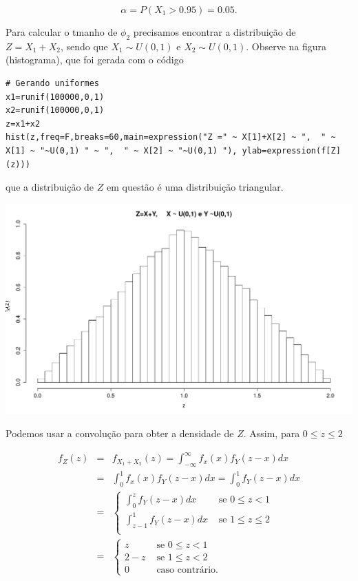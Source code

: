 \documentclass[10pt,brazil]{exam}
\begin{document}
\begin{enumerate}[1.]
\begin{enumerate}[a)]
\[\alpha=P(X_1>0.95)=0.05.\]


Para calcular o tmanho de $\phi_2$ precisamos encontrar a distribuição de $Z=X_1+X_2$, sendo que $X_1\sim U(0,1)$ e $X_2\sim U(0,1)$. Observe na figura (histograma), que foi gerada com o código 
\begin{lstlisting}
# Gerando uniformes
x1=runif(100000,0,1)
x2=runif(100000,0,1)
z=x1+x2
hist(z,freq=F,breaks=60,main=expression("Z =" ~ X[1]+X[2] ~ ",  " ~ X[1] ~ "~U(0,1) " ~ ",  " ~ X[2] ~ "~U(0,1) "), ylab=expression(f[Z](z)))
\end{lstlisting}

que a distribuição de $Z$ em questão é uma distribuição triangular.

\begin{center}
\includegraphics[scale=0.4]{sumunif.pdf} 
\end{center} 

Podemos usar a convolução para obter a densidade de $Z$. Assim, para $0\leq z\leq 2$

\begin{eqnarray*}
f_Z(z)&=&f_{X_1+X_2}(z)=
\int_{-\infty}^{\infty}f_x(x)f_Y(z-x)dx\\
&=&\int_{0}^{1}f_x(x)f_Y(z-x)dx
=\int_{0}^{1}f_Y(z-x)dx\\
&=&\begin{cases}
 \int_{0}^{z} f_Y(z-x)dx & \mbox{ se } 0\leq z< 1\\
 \int_{z-1}^{1} f_Y(z-x)dx & \mbox{ se } 1\leq z\leq 2\\
\end{cases}\\
&=&\begin{cases}
 z & \mbox{ se } 0\leq z< 1\\
 2-z & \mbox{ se } 1\leq z< 2\\
 0 & \mbox{ caso contrário.}
\end{cases}
\end{eqnarray*} 


\end{enumerate}
\end{enumerate}
\end{document}
